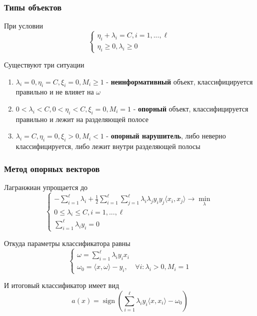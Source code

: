 \documentclass{beamer}
\DeclareMathOperator{\sign}{sign}
\begin{document}
	\begin{frame}
		\frametitle{Типы объектов}
		 При условии
		 \[
		 \begin{cases}
		 	\eta_i + \lambda_i = C, i=1, ..., \ell \\
		 	\eta_i \ge 0, \lambda_i \ge 0
		 \end{cases}
		 \]
		 
		 Существуют три ситуации
		 \begin{enumerate}
		 	\item $\lambda_i = 0, \eta_i = C, \xi_i = 0, M_i \ge 1$
		 	- \textbf{неинформативный}  объект, классифицируется правильно и не влияет на $\omega$
		 	
		 	\item $0 < \lambda_i < C, 0 < \eta_i < C, \xi_i = 0, M_i = 1$
		 	- \textbf{опорный} объект, классифицируется правильно и лежит на разделяющей полосе
		 	
		 	\item $\lambda_i = C, \eta_i = 0, \xi_i > 0, M_i < 1$
		 	- \textbf{опорный нарушитель}, либо неверно классифицируется, либо лежит внутри разделяющей полосы
		 \end{enumerate}
	\end{frame}
	
	\begin{frame}
		\frametitle{Метод опорных векторов}
		Лагранжиан упрощается до
		\[
		\begin{cases}
			- \sum_{i=1}^{\ell} \lambda_i + 
			\frac{1}{2} \sum_{i=1}^{\ell} \sum_{j=1}^{\ell}
			\lambda_i \lambda_j y_i y_j \langle x_i, x_j \rangle
			\rightarrow \min_{\lambda} \\
			
			0 \le \lambda_i \le C, i=1, ..., \ell \\
			
			\sum_{i=1}^{\ell} \lambda_i y_i = 0
		\end{cases}
		\]
		
		 Откуда параметры классификатора равны
		\[
		\begin{cases}
			\omega = \sum_{i=1}^{\ell} \lambda_i y_i x_i \\
			\omega_0 = \langle x, \omega \rangle - y_i, & \forall i: \lambda_i > 0, M_i = 1
		\end{cases}
		\]
		
		И итоговый классификатор имеет вид
		\[
		a(x) = \sign \left( \sum_{i=1}^{\ell} \lambda_i y_i \langle x, x_i \rangle - \omega_0 \right)
		\]
	\end{frame}
	
\end{document}
